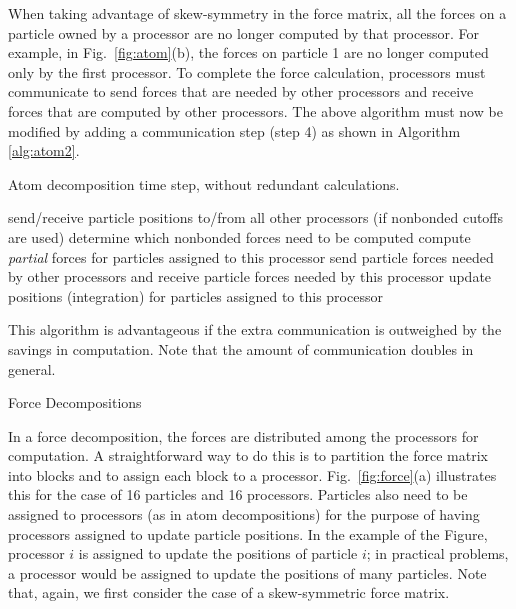 When taking advantage of skew-symmetry in the force matrix,
all the forces on a particle owned by a processor are no longer computed
by that processor.  For example, in Fig.~\ref{fig:atom}(b), the forces
on particle 1 are no longer computed only by the first processor.  
To complete the force calculation,
processors must communicate to send forces that are needed by other
processors and receive forces that are computed by other processors.
The above algorithm must now be modified by adding a communication
step (step 4) as shown in Algorithm \ref{alg:atom2}.
\begin{algorithm}
\caption{Atom decomposition time step, without redundant calculations.}
\label{alg:atom2}
\begin{algorithmic}[1]
\STATE send/receive particle positions to/from all other processors
\STATE (if nonbonded cutoffs are used) determine which nonbonded forces need to be computed
\STATE compute {\em partial} forces for particles assigned to this processor
\STATE send particle forces needed by other processors and receive particle forces needed by this processor
\STATE update positions (integration) for particles assigned to this processor
\end{algorithmic}
\end{algorithm}

This algorithm is advantageous if the extra communication is outweighed by
the savings in computation.  Note that the amount of communication doubles
in general.

 {Force Decompositions}

In a force decomposition, the forces are distributed among the processors
for computation.  A straightforward way to do this is to partition
the force matrix into blocks and to assign each block to a processor.
Fig.~\ref{fig:force}(a) illustrates this for the case of 16 particles
and 16 processors.  
Particles also need to be assigned to processors (as in atom decompositions)
for the purpose of having processors assigned to update particle positions.
In the example of the Figure, processor $i$ is assigned to update the
positions of particle $i$; in practical problems, a processor would 
be assigned to update the positions of many particles.
Note that, again, we first consider the case of a skew-symmetric
force matrix.  

